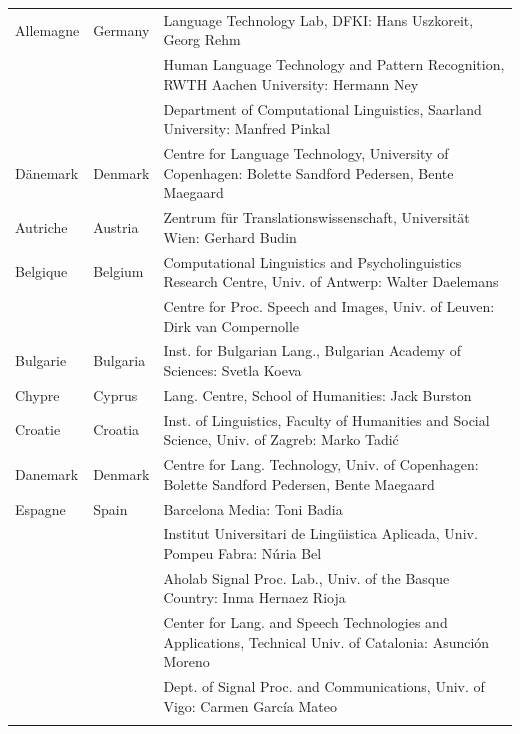 \small
\begin{longtable}{llp{105mm}}
  Allemagne & \textcolor{grey1}{Germany} &  Language Technology Lab, DFKI: Hans Uszkoreit, Georg Rehm\\ \addlinespace
  & & Human Language Technology and Pattern Recognition, RWTH Aachen University: Hermann Ney \\ \addlinespace
  & & Department of Computational Linguistics, Saarland University: Manfred Pinkal\\ \addlinespace Dänemark &  \textcolor{grey1}{Denmark} & Centre for Language Technology, University of Copenhagen: \newline Bolette Sandford Pedersen, Bente Maegaard\\ \addlinespace

  Autriche & \textcolor{grey1}{Austria} & Zentrum für Translationswissenschaft, Universität Wien: Gerhard Budin\\ \addlinespace 

  Belgique & \textcolor{grey1}{Belgium} & Computational Linguistics and Psycholinguistics Research Centre, Univ. of Antwerp: Walter Daelemans\\ \addlinespace
  & & Centre for Proc. Speech and Images, Univ. of Leuven: Dirk van Compernolle \\ \addlinespace

  Bulgarie & \textcolor{grey1}{Bulgaria} & Inst. for Bulgarian Lang., Bulgarian Academy of Sciences: Svetla Koeva \\ \addlinespace

  Chypre & \textcolor{grey1}{Cyprus} & Lang. Centre, School of Humanities: Jack Burston\\ \addlinespace

  Croatie & \textcolor{grey1}{Croatia} & Inst. of Linguistics, Faculty of Humanities and Social Science, Univ. of Zagreb: Marko Tadić \\ \addlinespace

  Danemark &  \textcolor{grey1}{Denmark} & Centre for Lang. Technology, Univ. of Copenhagen: Bolette Sandford Pedersen, Bente Maegaard\\ \addlinespace

  Espagne & \textcolor{grey1}{Spain} & Barcelona Media: Toni Badia \\ \addlinespace 
  & & Institut Universitari de Lingüistica Aplicada, Univ. Pompeu Fabra: Núria Bel \\ \addlinespace 
  & & Aholab Signal Proc. Lab., Univ. of the Basque Country: Inma Hernaez Rioja \\ \addlinespace 
  & & Center for Lang. and Speech Technologies and Applications, Technical Univ. of Catalonia: Asunción Moreno \\ \addlinespace 
  & & Dept. of Signal Proc. and Communications, Univ. of Vigo: Carmen García Mateo \\ \addlinespace 


\end{longtable}
